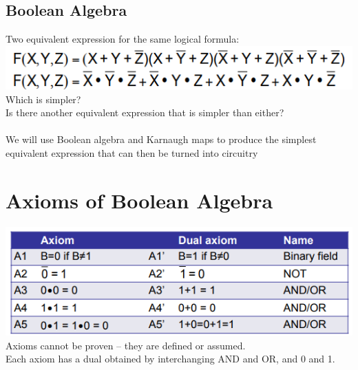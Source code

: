 \documentclass{article}[18pt]
\begin{document}
\subsection{Boolean Algebra}
Two equivalent expression for the same logical formula: \\
\includegraphics[scale=0.7]{BoolForm.png}\\
Which is simpler?\\
Is there another equivalent expression that is simpler than either?\\
\\
We will use Boolean algebra and Karnaugh maps to produce the simplest
equivalent expression that can then be turned into circuitry
\section{Axioms of Boolean Algebra}
\includegraphics[scale=0.7]{Axioms.png}\\
Axioms cannot be proven – they are defined or assumed.\\
Each axiom has a dual obtained by interchanging AND and OR,
and 0 and 1.
\end{document}
